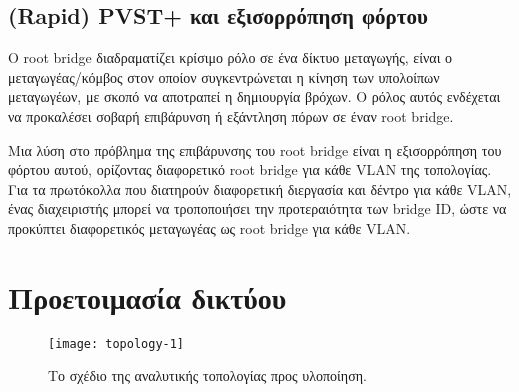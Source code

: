 \documentclass[eforms]{EdipyLabs} %
\begin{document}
\begin{table}[ht]\renewcommand\arraystretch{1.5}%
\caption{Καταστάσεις θυρών για STP και RSTP.}\label{tab:comparison2}
\end{table}


\subsection{(Rapid) PVST+ και εξισορρόπηση φόρτου}
O root bridge διαδραματίζει κρίσιμο ρόλο σε ένα δίκτυο μεταγωγής, είναι ο μεταγωγέας/κόμβος στον οποίον συγκεντρώνεται η κίνηση των υπολοίπων μεταγωγέων, με σκοπό να αποτραπεί η δημιουργία βρόχων. Ο ρόλος αυτός ενδέχεται να προκαλέσει σοβαρή επιβάρυνση ή εξάντληση πόρων σε έναν root bridge.

Μια λύση στο πρόβλημα της επιβάρυνσης του root bridge είναι η εξισορρόπηση του φόρτου αυτού, ορίζοντας διαφορετικό root bridge για κάθε VLAN της τοπολογίας. Για τα πρωτόκολλα που διατηρούν διαφορετική διεργασία και δέντρο για κάθε VLAN, ένας διαχειριστής μπορεί να τροποποιήσει την προτεραιότητα των bridge ID, ώστε να προκύπτει διαφορετικός μεταγωγέας ως root bridge για κάθε VLAN.

\newpage
\section{Προετοιμασία δικτύου}\label{sec:2}

\begin{figure}[H]
	\centering
	\texttt{[image: topology-1]}
	\caption{Το σχέδιο της αναλυτικής τοπολογίας προς υλοποίηση.}\label{fig:topology-1}
\end{figure}
\end{document}

